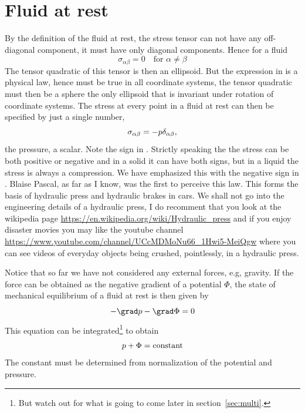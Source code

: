 \section{Fluid at rest}
By the definition of the fluid at rest, the stress tensor can not have
any off-diagonal component, it must have only diagonal components.
Hence for a fluid 
\begin{equation}
\sigma_{\alpha\beta} = 0 \quad\text{for $\alpha\neq\beta$} 
\label{A1.2:statics}
\end{equation}
The tensor quadratic of this tensor is then an ellipsoid. 
But the expression in  is a physical law, hence must be true in all
coordinate systems, the tensor quadratic must then be a sphere
the only ellipsoid that is invariant under rotation of coordinate
systems. The stress at every point in a fluid at rest can then be
specified by just a single number, 
\begin{equation}
\sigma_{\alpha\beta} = -p \delta_{\alpha\beta}\/,
\label{A1.2:pressure}
\end{equation}
the pressure, a scalar. Note the sign in . 
Strictly speaking the the stress can be both positive or negative and
in a solid it can have both signs, but in a liquid the stress is
always a compression. We have emphasized this with the negative sign
in . Blaise Pascal, as far as I know, was the first to perceive
this law. This forms the basis of hydraulic press and hydraulic brakes
in cars. We shall not go into the engineering details of a hydraulic
press, I do recomment that you look at the wikipedia page
\url{https://en.wikipedia.org/wiki/Hydraulic_press} and if you enjoy
disaster movies you may like the youtube channel 
\url{https://www.youtube.com/channel/UCcMDMoNu66_1Hwi5-MeiQgw}
where you can see videos of everyday objects being crushed,
pointlessly, in a hydraulic press. 

Notice that so far we have not considered any external forces, e.g,
gravity.  If the force can be obtained as the negative gradient of a potential
$\Phi$, the state of mechanical equilibrium of a fluid
at rest is then given by 
\begin{equation}
-\grad p - \grad \Phi = 0 
\label{A1.2:fstatics}
\end{equation}
This equation can be integrated\footnote{But watch out for what is
  going to come later in section~\ref{sec:multi}.} to obtain 
\begin{equation}
p + \Phi = {\rm constant}
\label{A1.2:pot}
\end{equation}
The constant must be determined from normalization of the potential
and pressure. 

